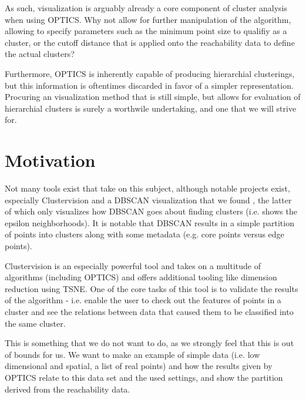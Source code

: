 \documentclass{vgtc}                          %
\begin{document}
\begin{flushleft}
As such, visualization is arguably already a core component of cluster analysis when using OPTICS. Why not allow for further manipulation of the algorithm, allowing to specify parameters such as the minimum point size to qualifiy as a cluster, or the cutoff distance that is applied onto the reachability data to define the actual clusters?
\end{flushleft}

\begin{flushleft}
Furthermore, OPTICS is inherently capable of producing hierarchial clusterings, but this information is oftentimes discarded in favor of a simpler representation. Procuring an visualization method that is still simple, but allows for evaluation of hierarchial clusters is surely a worthwile undertaking, and one that we will strive for.
\end{flushleft}

\section{Motivation} %

\begin{flushleft}
 Not many tools exist that take on this subject, although notable projects exist, especially Clustervision\cite{Clustervision} and a DBSCAN visualization that we found \cite{DBSCAN}, the latter of which only visualizes how DBSCAN goes about finding clusters (i.e. shows the epsilon neighborhoods). It is notable that DBSCAN results in a simple partition of points into clusters along with some metadata (e.g. core points versus edge points).
\end{flushleft}

\begin{flushleft}
Clustervision is an especially powerful tool and takes on a multitude of algorithms (including OPTICS) and offers additional tooling like dimension reduction using TSNE. One of the core tasks of this tool is to validate the results of the algorithm - i.e. enable the user to check out the features of points in a cluster and see the relations between data that caused them to be classified into the same cluster.
\end{flushleft}

\begin{flushleft}
This is something that we do not want to do, as we strongly feel that this is out of bounds for us. We want to make an example of simple data (i.e. low dimensional and spatial, a list of real points) and how the results given by OPTICS relate to this data set and the used settings, and show the partition derived from the reachability data.
\end{flushleft}
\end{document}
